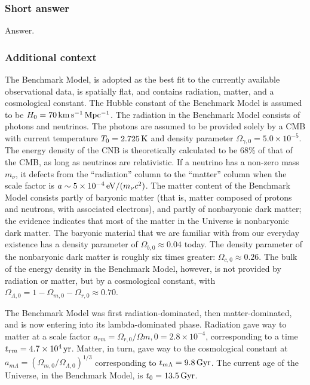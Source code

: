 \documentclass[a4paper,11pt]{article}
\begin{document}
\subsubsection{Short answer}

Answer.

\subsubsection{Additional context}

{\noindent}The Benchmark Model, is adopted as the best fit to the currently available observational data, is spatially flat, and contains radiation, matter, and a cosmological constant. The Hubble constant of the Benchmark Model is assumed to be $H_0=70\,{\rm km\,s^{-1}\,Mpc^{-1}}$. The radiation in the Benchmark Model consists of photons and neutrinos. The photons are assumed to be provided solely by a CMB with current temperature $T_0=2.725\,{\rm K}$ and density parameter $\Omega_{\gamma,0}=5.0\times10^{-5}$. The energy density of the CNB is theoretically calculated to be 68\% of that of the CMB, as long as neutrinos are relativistic. If a neutrino has a non-zero mass $m_\nu$, it defects from the ``radiation'' column to the ``matter'' column when the scale factor is $a\sim5\times10^{-4}\,{\rm eV}/(m_\nu c^2)$. The matter content of the Benchmark Model consists partly of baryonic matter (that is, matter composed of protons and neutrons, with associated electrons), and partly of nonbaryonic dark matter; the evidence indicates that most of the matter in the Universe is nonbaryonic dark matter. The baryonic material that we are familiar with from our everyday existence has a density parameter of $\Omega_{b,0}\approx0.04$ today. The density parameter of the nonbaryonic dark matter is roughly six times greater: $\Omega_{c,0}\approx0.26$. The bulk of the energy density in the Benchmark Model, however, is not provided by radiation or matter, but by a cosmological constant, with $\Omega_{\Lambda,0}=1-\Omega_{m,0}-\Omega_{r,0}\approx0.70$.

{\noindent}The Benchmark Model was first radiation-dominated, then matter-dominated, and is now entering into its lambda-dominated phase. Radiation gave way to matter at a scale factor $a_{rm}=\Omega_{r,0}/\Omega{m,0}=2.8\times10^{-4}$, corresponding to a time $t_{rm}=4.7\times10^4\,{\rm yr}$. Matter, in turn, gave way to the cosmological constant at $a_{m\Lambda}=(\Omega_{m,0}/\Omega_{\Lambda,0})^{1/3}$ corresponding to $t_{m\Lambda}=9.8\,{\rm Gyr}$. The current age of the Universe, in the Benchmark Model, is $t_0=13.5\,{\rm Gyr}$.
\end{document}
